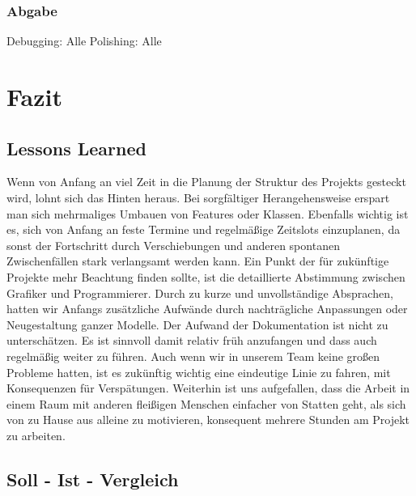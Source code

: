 \documentclass[10pt]{article}
\begin{document}
\vspace{0.5cm}
\subsubsection{Abgabe}

Debugging: Alle\newline
Polishing: Alle\newline

\newpage
\section{Fazit}

\vspace{0.5cm}
\subsection{Lessons Learned}

Wenn von Anfang an viel Zeit in die Planung der Struktur des Projekts gesteckt wird, lohnt sich das Hinten heraus. Bei sorgfältiger Herangehensweise erspart man sich mehrmaliges Umbauen von Features oder Klassen. Ebenfalls wichtig ist es, sich von Anfang an feste Termine und regelmäßige Zeitslots einzuplanen, da sonst der Fortschritt durch Verschiebungen und anderen spontanen Zwischenfällen stark verlangsamt werden kann.\newline
Ein Punkt der für zukünftige Projekte mehr Beachtung finden sollte, ist die detaillierte Abstimmung zwischen Grafiker und Programmierer. Durch zu kurze und unvollständige Absprachen, hatten wir Anfangs zusätzliche Aufwände durch nachträgliche Anpassungen oder Neugestaltung ganzer Modelle.\newline
Der Aufwand der Dokumentation ist nicht zu unterschätzen. Es ist sinnvoll damit relativ früh anzufangen und dass auch regelmäßig weiter zu führen. \newline
Auch wenn wir in unserem Team keine großen Probleme hatten, ist es zukünftig wichtig eine eindeutige Linie zu fahren, mit Konsequenzen für Verspätungen.\newline
Weiterhin ist uns aufgefallen, dass die Arbeit in einem Raum mit anderen fleißigen Menschen einfacher von Statten geht, als sich von zu Hause aus alleine zu motivieren, konsequent mehrere Stunden am Projekt zu arbeiten.

\vspace{0.5cm}
\subsection{Soll - Ist - Vergleich}
\end{document}
